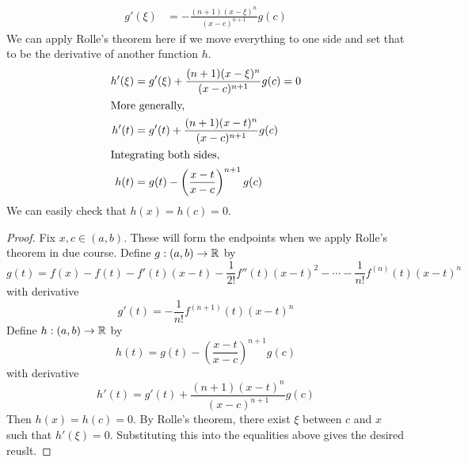 \begin{intuition}
\begin{align*}
    g'(\xi) &= -\frac{(n + 1) (x - \xi) ^ n}{(x - c) ^ {n + 1}} g(c)
  \end{align*}
  We can apply Rolle's theorem here if we move everything to one side and set that to be the derivative of another function $h$.
  \begin{align*}
    h'(\xi) &= g'(\xi) + \frac{(n + 1) (x - \xi) ^ n}{(x - c) ^ {n + 1}} g(c) = 0 \\ 
    \intertext{More generally, }
    h'(t) &= g'(t) + \frac{(n + 1) (x - t) ^ n}{(x - c) ^ {n + 1}} g(c) \\ 
    \intertext{Integrating both sides,}
    h(t) &= g(t) - \left(\frac{x - t}{x - c}\right) ^ {n + 1} g(c)
  \end{align*}
  We can easily check that $h(x) = h(c) = 0$.
\end{intuition}
\begin{proof}
  Fix $x, c \in (a, b)$. These will form the endpoints when we apply Rolle's theorem in due course. Define $g: (a, b) \to \mathbb{R}$ by
  \[
    g(t) = f(x) - f(t) - f'(t)(x - t) - \frac{1}{2!} f''(t) (x - t) ^ 2 - \cdots - \frac{1}{n!} f ^ {(n)} (t) (x - t) ^ n
  \]
  with derivative
  \[
    g'(t) = -\frac{1}{n!} f ^ {(n + 1)} (t) (x - t) ^ n
  \]
  Define $h: (a, b) \to \mathbb{R}$ by
  \[
    h(t) = g(t) - \left(\frac{x - t}{x - c}\right) ^ {n + 1} g(c)
  \]
  with derivative
  \[
    h'(t) = g'(t) + \frac{(n + 1) (x - t) ^ n}{(x - c) ^ {n + 1}} g(c)
  \]
  Then $h(x) = h(c) = 0$. By Rolle's theorem, there exist $\xi$ between $c$ and $x$ such that $h'(\xi) = 0$. Substituting this into the equalities above gives the desired reuslt.
\end{proof}



